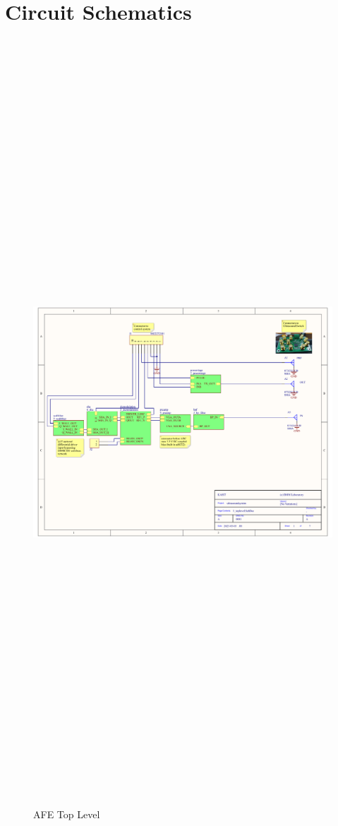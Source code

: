 \chapter{Circuit Schematics}
\begin{landscape}
	\begin{figure}[htbp]
		\centering
		\includegraphics[width=20cm,height=28.7cm,keepaspectratio]{Figures/appendix/afe_altium/1_toplevel.pdf}
		\caption{AFE Top Level}
		\label{fig:appendix_1_toplevel}
	\end{figure}
\end{landscape}
